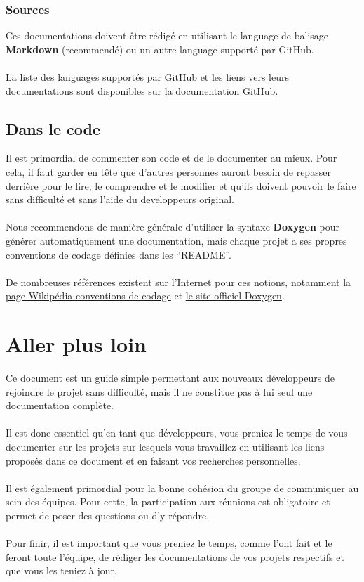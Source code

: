 \documentclass{life-fr}
\begin{document}
\subsection{Sources}

Ces documentations doivent être rédigé en utilisant le language
de balisage \textbf{Markdown} (recommendé) ou un autre
language supporté par GitHub.\\
\\
La liste des languages supportés par GitHub et les liens vers
leurs documentations sont disponibles sur
\href{https://github.com/github/markup#markups}{la documentation GitHub}.

\section{Dans le code}

Il est primordial de commenter son code et de le documenter au mieux.
Pour cela, il faut garder en tête que d'autres personnes auront besoin
de repasser derrière pour le lire, le comprendre et le modifier et qu'ils
doivent pouvoir le faire sans difficulté et sans l'aide du developpeurs
original.\\
\\
Nous recommendons de manière générale d'utiliser la syntaxe \textbf{Doxygen}
pour générer automatiquement une documentation, mais chaque projet
a ses propres conventions de codage définies dans les ``README''.\\
\\
De nombreuses références existent sur l'Internet pour ces notions, notamment
\href{http://fr.wikipedia.org/wiki/R%C3%A8gles_de_codage}{la page Wikipédia
conventions de codage} et \href{http://www.doxygen.org/}{le site officiel Doxygen}.


\chapter{Aller plus loin}

Ce document est un guide simple permettant aux nouveaux développeurs
de rejoindre le projet sans difficulté, mais il ne constitue pas à lui
seul une documentation complète.\\
\\
Il est donc essentiel qu'en tant que développeurs, vous preniez le temps
de vous documenter sur les projets sur lesquels vous travaillez en utilisant
les liens proposés dans ce document et en faisant vos recherches personnelles.\\
\\
Il est également primordial pour la bonne cohésion du groupe de communiquer
au sein des équipes. Pour cette, la participation aux réunions est obligatoire
et permet de poser des questions ou d'y répondre.\\
\\
Pour finir, il est important que vous preniez le temps, comme l'ont fait
et le feront toute l'équipe, de rédiger les documentations de vos projets
respectifs et que vous les teniez à jour.
\end{document}
